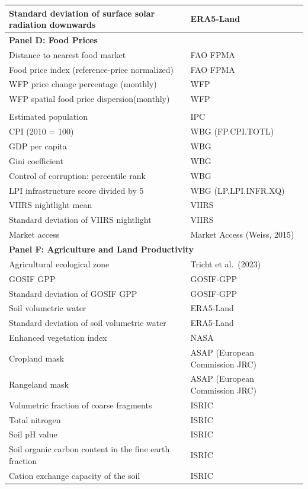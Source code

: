 \documentclass[pdflatex,sn-mathphys-num]{sn-jnl}%
\theoremstyle{thmstyleone}%
\theoremstyle{thmstyletwo}%
\theoremstyle{thmstylethree}%
\begin{document}
\begin{scriptsize}
\begin{longtable}{p{6cm}p{5cm}}
Standard deviation of surface solar radiation downwards & ERA5-Land \\
\midrule
\multicolumn{2}{l}{\textbf{Panel D: Food Prices}} \\
\midrule
Distance to nearest food market & FAO FPMA \\
Food price index (reference-price normalized) & FAO FPMA \\
WFP price change percentage (monthly) & WFP \\
WFP spatial food price dispersion(monthly) & WFP \\
\pagebreak
\multicolumn{2}{l}{\textbf{Panel E: Economic}} \\
\midrule
Estimated population & IPC \\
CPI (2010 = 100) & WBG (FP.CPI.TOTL) \\
GDP per capita & WBG \\
Gini coefficient & WBG \\ 
Control of corruption: percentile rank & WBG\\
LPI infrastructure score divided by 5 & WBG (LP.LPI.INFR.XQ) \\
VIIRS nightlight mean & VIIRS \\
Standard deviation of VIIRS nightlight & VIIRS \\
Market access & Market Access (Weiss, 2015) \\
\midrule
\multicolumn{2}{l}{\textbf{Panel F: Agriculture and Land Productivity}} \\
\midrule
Agricultural ecological zone & Tricht et al.\ (2023) \\
GOSIF GPP & GOSIF-GPP \\
Standard deviation of GOSIF GPP & GOSIF-GPP \\
Soil volumetric water & ERA5-Land \\
Standard deviation of soil volumetric water & ERA5-Land \\
Enhanced vegetation index & NASA \\
Cropland mask & ASAP (European Commission JRC) \\
Rangeland mask & ASAP (European Commission JRC) \\
Volumetric fraction of coarse fragments & ISRIC \\
Total nitrogen & ISRIC \\
Soil pH value & ISRIC \\
Soil organic carbon content in the fine earth fraction & ISRIC \\
Cation exchange capacity of the soil & ISRIC \\
\end{longtable}
\end{scriptsize}
\end{document}
